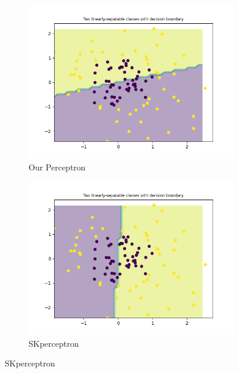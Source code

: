     \begin{figure}[ht]
        \centering
        \begin{subfigure}{0.4\textwidth}
            \centering
            \includegraphics[width=\linewidth]{code/plots/our_perceptron_LR0.0001_ITER10000_dataset_load_non_linearly_separable_data.png}
            \caption{Our Perceptron}
            \label{fig:image1}
        \end{subfigure}
        \hspace{2cm} %
        \begin{subfigure}{0.4\textwidth}
            \centering
            \includegraphics[width=\linewidth]{code/plots/SKperceptron_LR0.0001_ITER10000_dataset_load_non_linearly_separable_data.png}
            \caption{SKperceptron}
            \label{fig:image2}
        \end{subfigure}
        \label{fig:overall}
    \end{figure}

